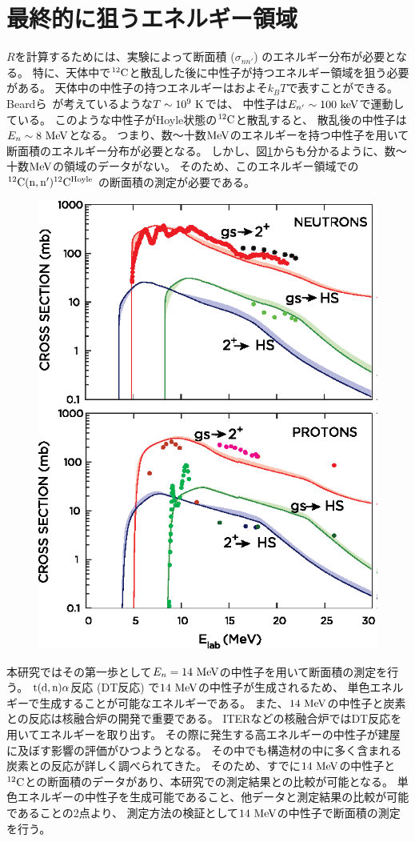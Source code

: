 \section{最終的に狙うエネルギー領域}
$R$を計算するためには、実験によって断面積 ($\sigma_{nn'}$) のエネルギー分布が必要となる。
特に、天体中で${}^{12}\rm{C}$と散乱した後に中性子が持つエネルギー領域を狙う必要がある。
天体中の中性子の持つエネルギーはおよそ$k_{B}T$で表すことができる。
Beardら~\cite{hotdensemedium}が考えているような$T\sim10^{9}~\rm{K}$では、
中性子は$E_{n'}\sim100~\rm{keV}$で運動している。
このような中性子がHoyle状態の${}^{12}\rm{C}$と散乱すると、
散乱後の中性子は$E_{n}\sim8~\rm{MeV}$となる。
つまり、数〜十数$\rm{MeV}$のエネルギーを持つ中性子を用いて断面積のエネルギー分布が必要となる。
しかし、図\ref{fig::crosssection_pres}からも分かるように、数〜十数$\rm{MeV}$の領域のデータがない。
そのため、このエネルギー領域での ${}^{12}\rm{C}(n,n'){}^{12}\rm{C}^{Hoyle}$ の断面積の測定が必要である。
\begin{figure}
  \centering
  \includegraphics[clip,width=0.6\columnwidth]{eps/cross_section_p_and_n.eps}
  \caption{}
  \label{fig::crosssection_pres}
\end{figure}

本研究ではその第一歩として$E_{n} = 14~\rm{MeV}$の中性子を用いて断面積の測定を行う。
$\rm{t}(\rm{d},n)\alpha$反応 (DT反応) で$14~\rm{MeV}$の中性子が生成されるため、
単色エネルギーで生成することが可能なエネルギーである。
また、$14~\rm{MeV}$の中性子と炭素との反応は核融合炉の開発で重要である。
ITERなどの核融合炉ではDT反応を用いてエネルギーを取り出す。
その際に発生する高エネルギーの中性子が建屋に及ぼす影響の評価がひつようとなる。
その中でも構造材の中に多く含まれる炭素との反応が詳しく調べられてきた。
そのため、すでに$14~\rm{MeV}$の中性子と${}^{12}\rm{C}$との断面積のデータがあり、本研究での測定結果との比較が可能となる。
単色エネルギーの中性子を生成可能であること、他データと測定結果の比較が可能であることの2点より、
測定方法の検証として$14~\rm{MeV}$の中性子で断面積の測定を行う。

